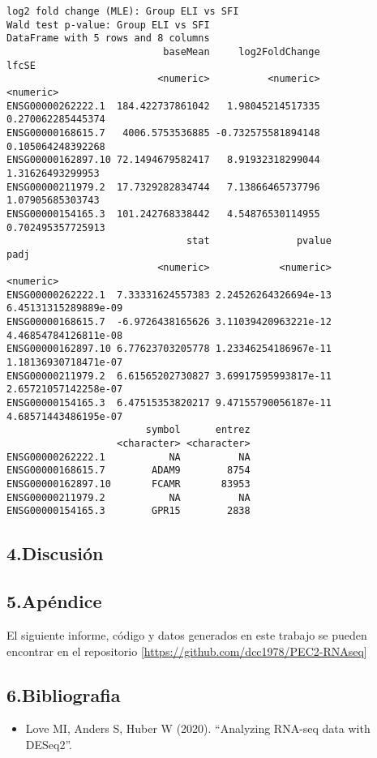 \documentclass[
]{article}
\providecommand{\tightlist}{%
  \setlength{\itemsep}{0pt}\setlength{\parskip}{0pt}}
\begin{document}
\begin{verbatim}
log2 fold change (MLE): Group ELI vs SFI 
Wald test p-value: Group ELI vs SFI 
DataFrame with 5 rows and 8 columns
                           baseMean     log2FoldChange             lfcSE
                          <numeric>          <numeric>         <numeric>
ENSG00000262222.1  184.422737861042   1.98045214517335 0.270062285445374
ENSG00000168615.7   4006.5753536885 -0.732575581894148 0.105064248392268
ENSG00000162897.10 72.1494679582417   8.91932318299044  1.31626493299953
ENSG00000211979.2  17.7329282834744   7.13866465737796  1.07905685303743
ENSG00000154165.3  101.242768338442   4.54876530114955 0.702495357725913
                               stat               pvalue                 padj
                          <numeric>            <numeric>            <numeric>
ENSG00000262222.1  7.33331624557383 2.24526264326694e-13 6.45131315289889e-09
ENSG00000168615.7  -6.9726438165626 3.11039420963221e-12 4.46854784126811e-08
ENSG00000162897.10 6.77623703205778 1.23346254186967e-11 1.18136930718471e-07
ENSG00000211979.2  6.61565202730827 3.69917595993817e-11 2.65721057142258e-07
ENSG00000154165.3  6.47515353820217 9.47155790056187e-11 4.68571443486195e-07
                        symbol      entrez
                   <character> <character>
ENSG00000262222.1           NA          NA
ENSG00000168615.7        ADAM9        8754
ENSG00000162897.10       FCAMR       83953
ENSG00000211979.2           NA          NA
ENSG00000154165.3        GPR15        2838
\end{verbatim}

\hypertarget{discusiuxf3n}{%
\subsection{4.Discusión}\label{discusiuxf3n}}

\hypertarget{apuxe9ndice}{%
\subsection{5.Apéndice}\label{apuxe9ndice}}

El siguiente informe, código y datos generados en este trabajo se pueden
encontrar en el repositorio
{[}\url{https://github.com/dcc1978/PEC2-RNAseq}{]}

\hypertarget{bibliografia}{%
\subsection{6.Bibliografia}\label{bibliografia}}

\begin{itemize}
\tightlist
\item
  Love MI, Anders S, Huber W (2020). ``Analyzing RNA-seq data with
  DESeq2''.
\end{itemize}
\end{document}

